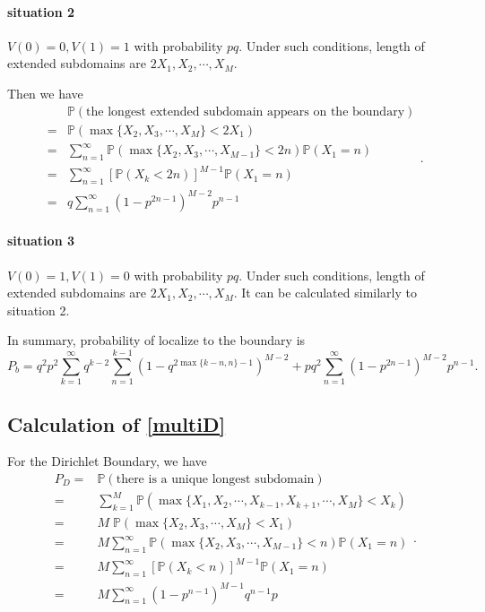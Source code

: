 \documentclass[a4paper,11pt]{article}
\begin{document}
\begin{appendices}
\paragraph*{situation 2}
$V(0) = 0, V(1) = 1$ with probability $p q$. Under such conditions, length of extended subdomains are $2 X_1, X_2, \cdots, X_M$.

Then we have
\begin{equation*}
\begin{split}
  & \mathbb{P}(\text{the longest extended subdomain appears on the boundary}) \\
= & \mathbb{P}(\max\{X_2, X_3, \cdots, X_{M}\} < 2 X_1) \\
= & \sum_{n=1}^{\infty} \mathbb{P}(\max\{X_2, X_3, \cdots, X_{M-1}\} < 2 n) \mathbb{P}(X_1 = n) \\
= & \sum_{n=1}^{\infty} [\mathbb{P}(X_k < 2 n)]^{M-1} \mathbb{P}(X_1 = n)\\
= & q \sum_{n=1}^{\infty} (1 - p^{2 n-1})^{M-2} p^{n-1}
\end{split}.
\end{equation*}

\paragraph*{situation 3}
$V(0) = 1, V(1) = 0$ with probability $p q$. Under such conditions, length of extended subdomains are $2 X_1, X_2, \cdots, X_M$. It can be calculated similarly to situation 2.

In summary, probability of localize to the boundary is
\begin{equation*}
P_b = q^2 p^2 \sum_{k=1}^{\infty} q^{k-2} \sum_{n=1}^{k-1} (1 - q^{2 \max\{k-n,n\}-1})^{M-2} + p q^2 \sum_{n=1}^{\infty} (1 - p^{2 n-1})^{M-2} p^{n-1}.
\end{equation*}

\subsection{Calculation of \eqref{multiD}}\label{appB2}

For the Dirichlet Boundary, we have
\begin{equation*}
\begin{split}
P_D = & \mathbb{P}(\text{there is a unique longest subdomain}) \\
= & \sum_{k=1}^{M} \mathbb{P}(\max\{X_1, X_2, \cdots, X_{k-1}, X_{k+1}, \cdots, X_{M}\} < X_k) \\
= & M \; \mathbb{P}(\max\{X_{2}, X_{3}, \cdots, X_{M}\} < X_1) \\
= & M \sum_{n=1}^{\infty} \mathbb{P}(\max\{X_2, X_3, \cdots, X_{M-1}\} < n) \mathbb{P}(X_1 = n) \\
= & M \sum_{n=1}^{\infty} [\mathbb{P}(X_k < n)]^{M-1} \mathbb{P}(X_1 = n)\\
= & M \sum_{n=1}^{\infty} (1 - p^{n-1})^{M-1} q^{n-1} p
\end{split}.
\end{equation*}


\end{appendices}
\end{document}
